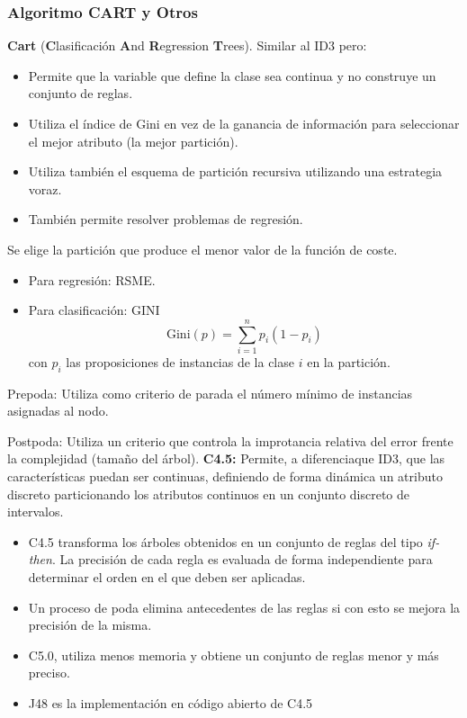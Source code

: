 \subsubsection{Algoritmo CART y Otros}
\textbf{Cart} (\textbf{C}lasificación \textbf{A}nd \textbf{R}egression \textbf{T}rees). Similar al ID3 pero:
\begin{itemize}
	\item Permite que la variable que define la clase sea continua y no construye un conjunto de reglas.
	\item Utiliza el índice de Gini en vez de la ganancia de información para seleccionar el mejor atributo (la mejor partición).
	\item Utiliza también el esquema de partición recursiva utilizando una estrategia voraz.
	\item También permite resolver problemas de regresión.
\end{itemize}
Se elige la partición que produce el menor valor de la función de coste.
\begin{itemize}
	\item Para regresión: RSME.
	\item Para clasificación: GINI \[ \mathrm{Gini}(p)=\sum_{i=1}^{n}p_i(1-p_i) \] con $p_i$ las proposiciones de instancias de la clase $i$ en la partición.
\end{itemize}
Prepoda: Utiliza como criterio de parada el número mínimo de instancias asignadas al nodo.

Postpoda: Utiliza un criterio que controla la improtancia relativa del error frente la complejidad (tamaño del árbol).
\textbf{C4.5:} Permite, a diferenciaque ID3, que las características puedan ser continuas, definiendo de forma dinámica un atributo discreto particionando los atributos continuos en un conjunto discreto de intervalos.
\begin{itemize}
	\item C4.5 transforma los árboles obtenidos en un conjunto de reglas del tipo \textit{if-then}. La precisión de cada regla es evaluada de forma independiente para determinar el orden en el que deben ser aplicadas.
	\item Un proceso de poda elimina antecedentes de las reglas si con esto se mejora la precisión de la misma.
	\item C5.0, utiliza menos memoria y obtiene un conjunto de reglas menor y más preciso.
	\item J48 es la implementación en código abierto de C4.5
\end{itemize}
